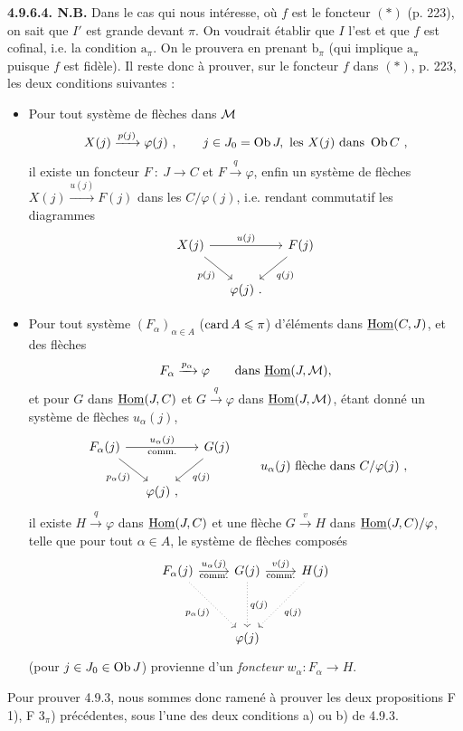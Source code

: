 \textbf{4.9.6.4. N.B.} Dans le cas qui nous intéresse, où $f$ est le foncteur $(*)$ (p. 223), on sait que $I'$ est grande devant $\pi$. On voudrait établir que $I$ l'est et que $f$ est cofinal, i.e. la condition $\mathrm{a}_\pi$. On le prouvera en prenant $\mathrm{b}_\pi$ (qui implique $\mathrm{a}_\pi$ puisque $f$ est fidèle). Il reste donc à
prouver, sur le foncteur $f$ dans $(*)$, p. 223, les deux conditions suivantes :
\begin{itemize}[label={}]
\item[F 1)] Pour tout système de flèches dans $\mathcal{M}$
\[
X(j) \xrightarrow{p(j)} \varphi(j) \ , \qquad j \in J_0 = \operatorname{Ob} J, \text{ les } X(j) \text{ dans } \operatorname{Ob} C \ ,
\]
il existe un foncteur $F \ : \ J \longrightarrow C$ et $F \xrightarrow{q} \varphi$, enfin un système de flèches $X(j) \xrightarrow{u(j)} F(j)$ dans les $C/\varphi(j)$, i.e. rendant commutatif les diagrammes %
\[
\begin{tikzcd}[column sep=small]
X(j) \arrow[rr, "u(j)"] \arrow[dr, "p(j)"'] & & F(j) \arrow[dl, "q(j)"] \\
& \varphi(j)\ . &
\end{tikzcd}
\]
\item[F $3_\pi$)] Pour tout système $(F_\alpha)_{\alpha \in A}$ ($\operatorname{card} A \leqslant \pi$) d'éléments dans $\underline{\operatorname{Hom}}(C,J)$, et des flèches %
\[
F_\alpha \xrightarrow{p_\alpha} \varphi \qquad \text{dans } \underline{\operatorname{Hom}}(J,\mathcal{M}),
\]
et pour $G$ dans $\underline{\operatorname{Hom}}(J,C)$ et $G \xrightarrow{q} \varphi$ dans $\underline{\operatorname{Hom}}(J,\mathcal{M})$, étant donné un système de flèches $u_\alpha(j)$,
\[
\begin{tikzcd}[column sep=small]
F_\alpha(j) \arrow[rr, "u_\alpha(j)", "\text{comm.}"'] \arrow[dr, "p_\alpha(j)"'] & & G(j) \arrow[dl, "q(j)"] \\
& \varphi(j)\ , &
\end{tikzcd}
\qquad u_\alpha(j) \text{ flèche dans } C/\varphi(j) \ ,
\]
il existe $H \xrightarrow{q} \varphi$ dans $\underline{\operatorname{Hom}}(J,C)$ et une flèche $G \xrightarrow{v} H$ dans $\underline{\operatorname{Hom}}(J,C)/\varphi$, telle que pour tout $\alpha \in A$, le système de flèches composés
\[
\begin{tikzcd}[row sep=huge]
F_\alpha(j) \arrow[r, "u_\alpha(j)", "\text{comm.}"'] \arrow[dr, dotted, "p_\alpha(j)"'] & G(j) \arrow[r, "v(j)", "\text{comm.}"'] \arrow[d, dotted, "q(j)"] & H(j) \arrow[dl, dotted, "q(j)"] \\
& \varphi(j) &
\end{tikzcd}
\]
(pour $j \in J_0 \in \operatorname{Ob} J$) provienne d'un \textit{foncteur} $w_\alpha : F_\alpha \longrightarrow H$. %
\end{itemize}
Pour prouver 4.9.3, nous sommes donc ramené à prouver les deux propositions F 1), F $3_\pi$) précédentes, sous l'une des deux conditions a) ou b) de 4.9.3.


